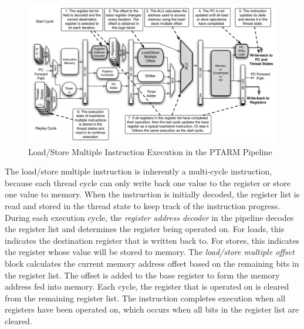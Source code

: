 \begin{figure}[h]
  
  \begin{center}
    \includegraphics[scale=.54]{figs/ldstrm_pipeline_implementation}
  \end{center}
  \vspace{-3mm}
  \caption{Load/Store Multiple Instruction Execution in the PTARM Pipeline}
  \label{fig:ldstrm_pipeline_implementation}
\end{figure}

The load/store multiple instruction is inherently a multi-cycle instruction, because each thread cycle can only write back one value to the register or store one value to memory.
When the instruction is initially decoded, the register list is read and stored in the thread state to keep track of the instruction progress.   
During each execution cycle, the \emph{register address decoder} in the pipeline decodes the register list and determines the register being operated on.
For loads, this indicates the destination register that is written back to.
For stores, this indicates the register whose value will be stored to memory.
The \emph{load/store multiple offset} block calculates the current memory address offset based on the remaining bits in the register list.
The offset is added to the base register to form the memory address fed into memory.
Each cycle, the register that is operated on is cleared from the remaining register list. 
The instruction completes execution when all registers have been operated on, which occurs when all bits in the register list are cleared. 


